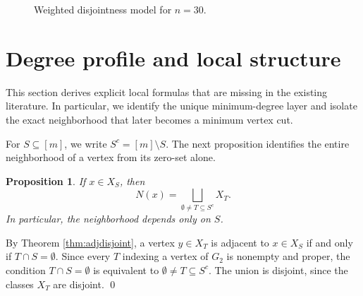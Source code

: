 \documentclass[12pt]{article}
\renewenvironment{proof}{{\bf \noindent Proof.}}{\qed}
\newtheorem{proposition}[theorem]{Proposition}
\theoremstyle{definition}
\begin{document}
	\begin{figure}[H]
		\centering
		\vspace*{-2mm}
		\caption{Weighted disjointness model for $n=30$.}
		\label{fig:n30model}
	\end{figure}
	
	\section{Degree profile and local structure}\label{sec:degree}
	 This section derives explicit local formulas that are missing in the existing literature. In particular, we identify the unique minimum-degree layer and isolate the exact neighborhood that later becomes a minimum vertex cut.
	
	For $S\subseteq [m]$, we write $S^c=[m]\setminus S$. The next proposition identifies the entire neighborhood of a vertex from its zero-set alone.	
	\begin{proposition}\label{prop:neighborhood}
		If $x\in X_S$, then
		$$
		N(x)=\bigsqcup_{\emptyset\neq T\subseteq S^c} X_T.
		$$
		In particular, the neighborhood depends only on $S$.
	\end{proposition}
	
	\begin{proof}
		By Theorem \ref{thm:adjdisjoint}, a vertex $y\in X_T$ is adjacent to $x\in X_S$ if and only if $T\cap S=\emptyset$. Since every $T$ indexing a vertex of $G_2$ is nonempty and proper, the condition $T\cap S=\emptyset$ is equivalent to $\emptyset\neq T\subseteq S^c$. The union is disjoint, since the classes $X_T$ are disjoint.
	\end{proof}
	
\end{document}
